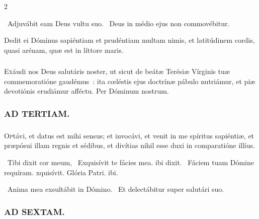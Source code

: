 \documentclass[9pt,twoside]{extarticle}
\begin{document}
\begin{multicols}{2}
{\begin{tightlist}{}
\item {}~Adjuvábit eam Deus vultu suo. ~Deus in médio ejus non commovébitur.
\item {} Dedit ei Dóminus sapiéntiam et prudéntiam multam nimis, et latitúdinem cordis, quasi arénam, quæ est in líttore maris.
\end{tightlist}

\subsubsection*{\center {}}
\lettrine{E}xáudi nos Deus salutáris noster, ut sicut de beátæ Terésiæ Vírginis tuæ commemoratióne gaudémus~: ita cœléstis ejus doctrínæ pábulo nutriámur, et piæ devotiónis erudiámur afféctu. Per Dóminum nostrum.

\begin{tightlist}{}
\item {}
\end{tightlist}

\subsubsection*{\center \textsc{AD TERTIAM.}}
\subsubsection*{\center {}}
\lettrine{O}ptávi, et datus est mihi sensus; et invocávi, et venit in me spíritus sapiéntiæ, et præpósui illam regnis et sédibus, et divítias nihil esse duxi in comparatióne illíus.

\begin{tightlist}{}
\item {}~Tibi dixit cor meum, \textred{*}~Exquisívit te fácies mea. ibi dixit. ~Fáciem tuam Dómine requíram. xquisívit. Glória Patri. ibi.
\item {}~Anima mea exsultábit in Dómino. ~Et delectábitur super salutári suo.
\end{tightlist}

\subsubsection*{\center \textsc{AD SEXTAM.}}
}
\end{multicols}
\end{document}
